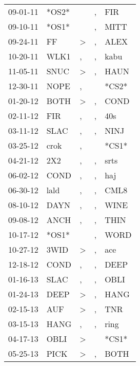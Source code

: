 \begin{supertabular}{lllll}
 09-01-11 &  *OS2* &                  &                , &    FIR \\
 09-10-11 &  *OS1* &                  &                , &   MITT \\
 09-24-11 &     FF &     \textgreater &                , &   ALEX \\
 10-20-11 &   WLK1 &                , &                , &   kabu \\
 11-05-11 &   SNUC &     \textgreater &                , &   HAUN \\
 12-30-11 &   NOPE &                , &                  &  *CS2* \\
 01-20-12 &   BOTH &     \textgreater &                , &   COND \\
 02-11-12 &    FIR &                , &                , &    40s \\
 03-11-12 &   SLAC &                , &                , &   NINJ \\
 03-25-12 &   crok &                , &                  &  *CS1* \\
 04-21-12 &    2X2 &                , &                , &   srts \\
 06-02-12 &   COND &                , &                , &    haj \\
 06-30-12 &   lald &                , &                , &   CML8 \\
 08-10-12 &   DAYN &                , &                , &   WINE \\
 09-08-12 &   ANCH &                , &                , &   THIN \\
 10-17-12 &  *OS1* &                  &                , &   WORD \\
 10-27-12 &   3WID &     \textgreater &                , &    ace \\
 12-18-12 &   COND &                , &                , &   DEEP \\
 01-16-13 &   SLAC &                , &                , &   OBLI \\
 01-24-13 &   DEEP &     \textgreater &                , &   HANG \\
 02-15-13 &    AUF &     \textgreater &                , &    TNR \\
 03-15-13 &   HANG &                , &                , &   ring \\
 04-17-13 &   OBLI &     \textgreater &                  &  *CS1* \\
 05-25-13 &   PICK &     \textgreater &                , &   BOTH \\

\end{supertabular}
